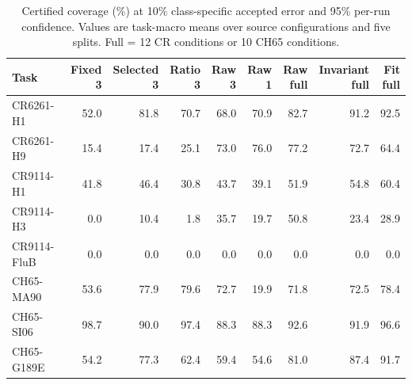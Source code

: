 \begin{table}[t]
\centering\footnotesize
\caption{Certified coverage (\%) at 10\% class-specific accepted error and 95\% per-run confidence. Values are task-macro means over source configurations and five splits. Full = 12 CR conditions or 10 CH65 conditions.}
\setlength{\tabcolsep}{4pt}
\begin{tabular}{lrrrrrrrr}
\toprule
Task & \shortstack{Fixed\\3} & \shortstack{Selected\\3} & \shortstack{Ratio\\3} & \shortstack{Raw\\3} & \shortstack{Raw\\1} & \shortstack{Raw\\full} & \shortstack{Invariant\\full} & \shortstack{Fit\\full} \\
\midrule
CR6261-H1 & 52.0 & 81.8 & 70.7 & 68.0 & 70.9 & 82.7 & 91.2 & 92.5 \\
CR6261-H9 & 15.4 & 17.4 & 25.1 & 73.0 & 76.0 & 77.2 & 72.7 & 64.4 \\
CR9114-H1 & 41.8 & 46.4 & 30.8 & 43.7 & 39.1 & 51.9 & 54.8 & 60.4 \\
CR9114-H3 & 0.0 & 10.4 & 1.8 & 35.7 & 19.7 & 50.8 & 23.4 & 28.9 \\
CR9114-FluB & 0.0 & 0.0 & 0.0 & 0.0 & 0.0 & 0.0 & 0.0 & 0.0 \\
CH65-MA90 & 53.6 & 77.9 & 79.6 & 72.7 & 19.9 & 71.8 & 72.5 & 78.4 \\
CH65-SI06 & 98.7 & 90.0 & 97.4 & 88.3 & 88.3 & 92.6 & 91.9 & 96.6 \\
CH65-G189E & 54.2 & 77.3 & 62.4 & 59.4 & 54.6 & 81.0 & 87.4 & 91.7 \\
\bottomrule
\end{tabular}
\end{table}
